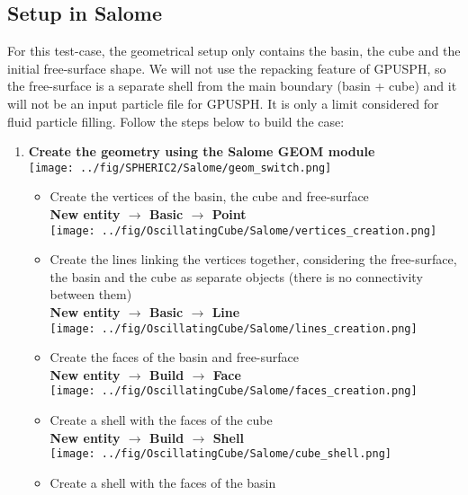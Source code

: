 \documentclass{../GPUSPHtemplate}
\begin{document}
\subsection{Setup in Salome}

For this test-case, the geometrical setup only contains the basin, the cube and the initial free-surface shape.
We will not use the repacking feature of GPUSPH, so the free-surface is a separate shell from the
main boundary (basin + cube) and it will not be an input particle file for GPUSPH. It is only a limit considered for
fluid particle filling. Follow the steps below to build the case:
\begin{enumerate}
\item \textbf{Create the geometry using the Salome GEOM module}\smallskip\\
  \texttt{[image: ../fig/SPHERIC2/Salome/geom\_switch.png]}
  \begin{itemize}
  \item Create the vertices of the basin, the cube and free-surface \\
    \textbf{New entity $\to$ Basic $\to$ Point}\smallskip\\
    \texttt{[image: ../fig/OscillatingCube/Salome/vertices\_creation.png]}
  \item Create the lines linking the vertices together, considering the free-surface, the basin and the cube as separate objects
    (there is no connectivity between them)\\
    \textbf{New entity $\to$ Basic $\to$ Line}\smallskip\\
    \texttt{[image: ../fig/OscillatingCube/Salome/lines\_creation.png]}
  \item Create the faces of the basin and free-surface\\
    \textbf{New entity $\to$ Build $\to$ Face}\smallskip\\
    \texttt{[image: ../fig/OscillatingCube/Salome/faces\_creation.png]}
  \item Create a shell with the faces of the cube\\
    \textbf{New entity $\to$ Build $\to$ Shell}\smallskip\\
    \texttt{[image: ../fig/OscillatingCube/Salome/cube\_shell.png]}
  \item Create a shell with the faces of the basin\\

\end{itemize}
\end{enumerate}
\end{document}
